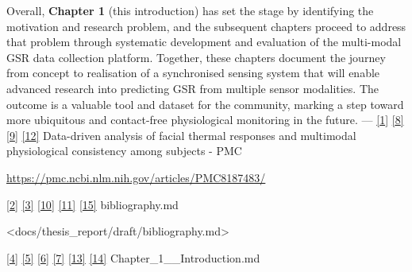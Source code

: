 \documentclass[12pt,a4paper]{article}
\begin{document}
Overall, \textbf{Chapter 1} (this introduction) has set the stage by identifying the motivation and research problem, and the subsequent chapters proceed to address that problem through systematic development and evaluation of the multi-modal GSR data collection platform. Together, these chapters document the journey from concept to realisation of a synchronised sensing system that will enable advanced research into predicting GSR from multiple sensor modalities. The outcome is a valuable tool and dataset for the community, marking a step toward more ubiquitous and contact-free physiological monitoring in the future. --- \href{https://pmc.ncbi.nlm.nih.gov/articles/PMC8187483/\#:~:text=Galvanic\%20skin\%20response\%20,conditions\%20which\%20recent\%20studies\%20have}{{[}1{]}} \href{https://pmc.ncbi.nlm.nih.gov/articles/PMC8187483/\#:~:text=measures\%20targeting\%20a\%20variety\%20of,in\%20affective\%20research7\%20\%E2\%80\%93\%2032}{{[}8{]}} \href{https://pmc.ncbi.nlm.nih.gov/articles/PMC8187483/\#:~:text=compliments\%20the\%20traditional\%20measures\%20is,results\%20in\%20affective\%20research\%2031\%E2\%80\%939}{{[}9{]}} \href{https://pmc.ncbi.nlm.nih.gov/articles/PMC8187483/\#:~:text=compliments\%20the\%20traditional\%20measures\%20is,results\%20in\%20affective\%20research\%2031\%E2\%80\%939}{{[}12{]}} Data-driven analysis of facial thermal responses and multimodal physiological consistency among subjects - PMC

\url{https://pmc.ncbi.nlm.nih.gov/articles/PMC8187483/}

\href{docs/thesis_report/draft/bibliography.md\#L2-L5}{{[}2{]}} \href{docs/thesis_report/draft/bibliography.md\#L2-L5}{{[}3{]}} \href{docs/thesis_report/draft/bibliography.md\#L41-L45}{{[}10{]}} \href{docs/thesis_report/draft/bibliography.md\#L13-L17}{{[}11{]}} \href{docs/thesis_report/draft/bibliography.md\#L2-L5}{{[}15{]}} bibliography.md

\textless docs/thesis\_report/draft/bibliography.md\textgreater{}

\href{docs/thesis_report/draft/Chapter_1__Introduction.md\#L10-L18}{{[}4{]}} \href{docs/thesis_report/draft/Chapter_1__Introduction.md\#L14-L22}{{[}5{]}} \href{docs/thesis_report/draft/Chapter_1__Introduction.md\#L18-L26}{{[}6{]}} \href{docs/thesis_report/draft/Chapter_1__Introduction.md\#L24-L31}{{[}7{]}} \href{docs/thesis_report/draft/Chapter_1__Introduction.md\#L24-L32}{{[}13{]}} \href{docs/thesis_report/draft/Chapter_1__Introduction.md\#L30-L34}{{[}14{]}} Chapter\_1\_\_Introduction.md
\end{document}
